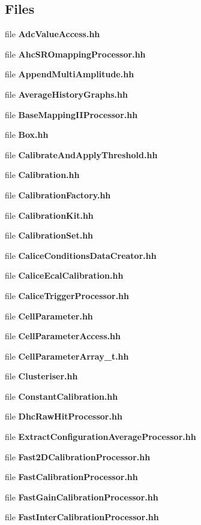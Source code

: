 \subsection*{Files}
\begin{DoxyCompactItemize}
\item 
file {\bfseries Adc\-Value\-Access.\-hh}
\item 
file {\bfseries Ahc\-S\-R\-Omapping\-Processor.\-hh}
\item 
file {\bfseries Append\-Multi\-Amplitude.\-hh}
\item 
file {\bfseries Average\-History\-Graphs.\-hh}
\item 
file {\bfseries Base\-Mapping\-I\-I\-Processor.\-hh}
\item 
file {\bfseries Box.\-hh}
\item 
file {\bfseries Calibrate\-And\-Apply\-Threshold.\-hh}
\item 
file {\bfseries Calibration.\-hh}
\item 
file {\bfseries Calibration\-Factory.\-hh}
\item 
file {\bfseries Calibration\-Kit.\-hh}
\item 
file {\bfseries Calibration\-Set.\-hh}
\item 
file {\bfseries Calice\-Conditions\-Data\-Creator.\-hh}
\item 
file {\bfseries Calice\-Ecal\-Calibration.\-hh}
\item 
file {\bfseries Calice\-Trigger\-Processor.\-hh}
\item 
file {\bfseries Cell\-Parameter.\-hh}
\item 
file {\bfseries Cell\-Parameter\-Access.\-hh}
\item 
file {\bfseries Cell\-Parameter\-Array\-\_\-t.\-hh}
\item 
file {\bfseries Clusteriser.\-hh}
\item 
file {\bfseries Constant\-Calibration.\-hh}
\item 
file {\bfseries Dhc\-Raw\-Hit\-Processor.\-hh}
\item 
file {\bfseries Extract\-Configuration\-Average\-Processor.\-hh}
\item 
file {\bfseries Fast2\-D\-Calibration\-Processor.\-hh}
\item 
file {\bfseries Fast\-Calibration\-Processor.\-hh}
\item 
file {\bfseries Fast\-Gain\-Calibration\-Processor.\-hh}
\item 
file {\bfseries Fast\-Inter\-Calibration\-Processor.\-hh}
\item 

\end{DoxyCompactItemize}
